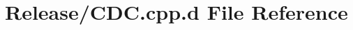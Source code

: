 \hypertarget{_release_2_c_d_c_8cpp_8d}{\section{\-Release/\-C\-D\-C.cpp.\-d \-File \-Reference}
\label{_release_2_c_d_c_8cpp_8d}
}
